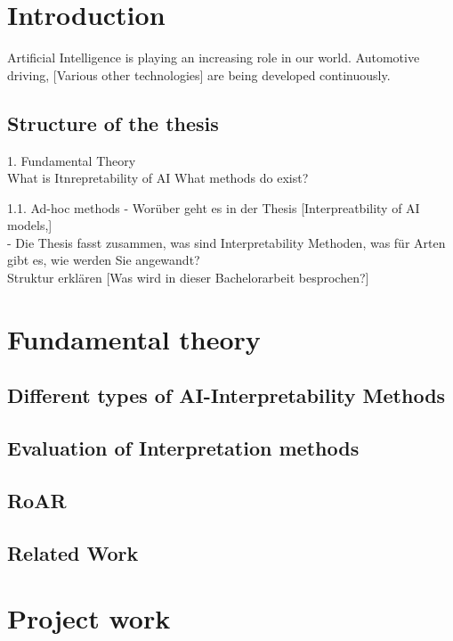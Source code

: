 
\chapter{Introduction}

Artificial Intelligence is playing an increasing role in our world. Automotive driving, [Various other technologies] are being developed continuously.\\

\section{Structure of the thesis}

1. Fundamental Theory\\
What is Itnrepretability of AI What methods do exist?

1.1. Ad-hoc methods
- Worüber geht es in der Thesis [Interpreatbility of AI models,]\\
- Die Thesis fasst zusammen, was sind Interpretability Methoden, was für Arten gibt es, wie werden Sie angewandt?\\
Struktur erklären [Was wird in dieser Bachelorarbeit besprochen?]

\chapter{Fundamental theory}

\section{Different types of AI-Interpretability Methods}



\section{Evaluation of Interpretation methods}

\section{RoAR}


\section{Related Work}



\chapter{Project work}




